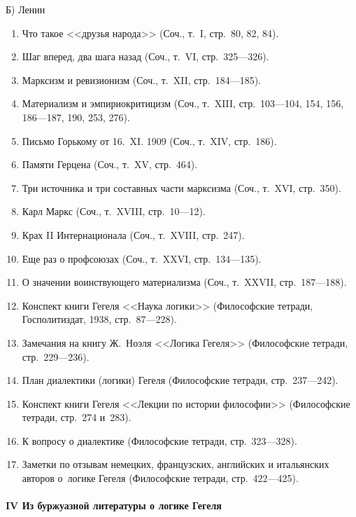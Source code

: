 {\centering Б) Ленин \par}

\begin{enumerate}
\item Что такое <<друзья народа>> (Соч., т.~I, стр.~80, 82, 84).
\item Шаг вперед, два шага назад (Соч., т.~VI, стр.~325---326).
\item Марксизм и ревизионизм (Соч., т.~XII, стр.~184---185).
\item Материализм и эмпириокритицизм (Соч., т.~XIII, стр.~103---104, 154, 156,
186---187, 190, 253, 276).
\item Письмо Горькому от 16.~XI. 1909 (Соч., т.~XIV, стр.~186).
\item Памяти Герцена (Соч., т.~XV, стр.~464).
\item Три источника и три составных части марксизма (Соч., т.~XVI, стр.~350).
\item Карл Маркс (Соч., т.~XVIII, стр.~10---12).
\item Крах II Интернационала (Соч., т.~XVIII, стр.~247).
\item Еще раз о профсоюзах (Соч., т.~XXVI, стр.~134---135).
\item О значении воинствующего материализма (Соч., т.~XXVII, стр.~187---188).
\item Конспект книги Гегеля <<Наука логики>> (Философские тетради,
Госполитиздат, 1938, стр.~87---228).
\item Замечания на книгу Ж.~Ноэля <<Логика Гегеля>> (Философские тетради,
стр.~229---236).
\item План диалектики (логики) Гегеля (Философские тетради, стр.~237---242).
\item Конспект книги Гегеля <<Лекции по истории философии>>
(Философские тетради, стр.~274 и~283).
\item К вопросу о диалектике (Философские тетради, стр.~323---328).
\item Заметки по отзывам немецких, французских, английских и итальянских
авторов о~логике Гегеля (Философские тетради, стр.~422---425).
\end{enumerate}

\paragraph[IV Из буржуазной литературы о логике Гегеля]
{IV Из буржуазной литературы о логике Гегеля}

